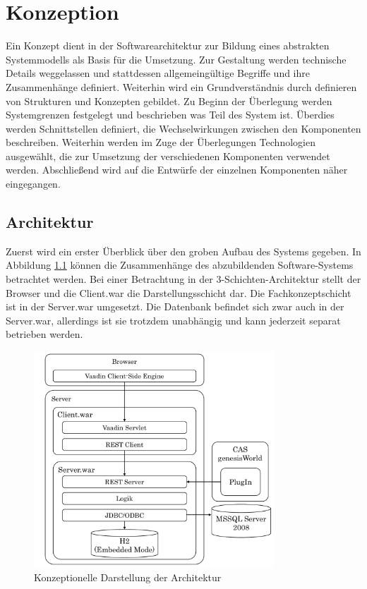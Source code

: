 
\chapter{Konzeption}
\label{ch:Konzeption}

Ein Konzept dient in der Softwarearchitektur zur Bildung eines abstrakten Systemmodells als Basis für die Umsetzung. Zur Gestaltung werden technische Details weggelassen und stattdessen allgemeingültige Begriffe und ihre Zusammenhänge definiert. Weiterhin wird ein Grundverständnis durch definieren von Strukturen und Konzepten gebildet. Zu Beginn der Überlegung werden Systemgrenzen festgelegt und beschrieben was Teil des System ist. Überdies werden Schnittstellen definiert, die Wechselwirkungen zwischen den Komponenten beschreiben. Weiterhin werden im Zuge der Überlegungen Technologien ausgewählt, die zur Umsetzung der verschiedenen Komponenten verwendet werden. Abschließend wird auf die Entwürfe der einzelnen Komponenten näher eingegangen.  

\section{Architektur}

Zuerst wird ein erster Überblick über den groben Aufbau des Systems gegeben. In Abbildung \ref{konzept_architektur} können die Zusammenhänge des abzubildenden Software-Systems betrachtet werden. Bei einer Betrachtung in der 3-Schichten-Architektur stellt der Browser und die Client.war die Darstellungsschicht dar. Die Fachkonzeptschicht ist in der Server.war umgesetzt. Die Datenbank befindet sich zwar auch in der Server.war, allerdings ist sie trotzdem unabhängig und kann jederzeit separat betrieben werden.

\begin{figure}[htbp]
\centering
  \includegraphics[width=0.8\textwidth, width=0.8\textwidth]{pics/Konzept_architektur.pdf}
\caption{Konzeptionelle Darstellung der Architektur}
\label{konzept_architektur}
\end{figure} 

